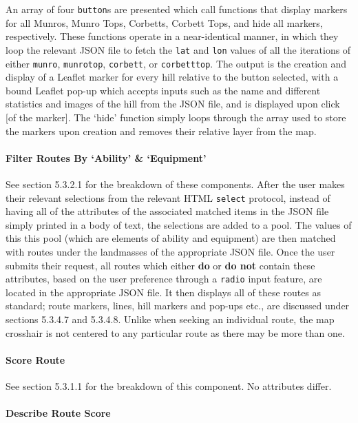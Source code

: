 \documentclass[11pt, english]{article}
\begin{document}
	An array of four \texttt{button}s are presented which call functions that display markers for all Munros, Munro Tops, Corbetts, Corbett Tops, and hide all markers, respectively. These functions operate in a near-identical manner, in which they loop the relevant JSON file to fetch the \texttt{lat} and \texttt{lon} values of all the iterations of either \texttt{munro}, \texttt{munrotop}, \texttt{corbett}, or \texttt{corbetttop}. The output is the creation and display of a Leaflet marker for every hill relative to the button selected, with a bound Leaflet pop-up which accepts inputs such as the name and different statistics and images of the hill from the JSON file, and is displayed upon click [of the marker]. The `hide' function simply loops through the array used to store the markers upon creation and removes their relative layer from the map.

			\paragraph{Filter Routes By `Ability' \& `Equipment'}

	See section 5.3.2.1 for the breakdown of these components. After the user makes their relevant selections from the relevant HTML \texttt{select} protocol, instead of having all of the attributes of the associated matched items in the JSON file simply printed in a body of text, the selections are added to a pool. The values of this this pool (which are elements of ability and equipment) are then matched with routes under the landmasses of the appropriate JSON file. Once the user submits their request, all routes which either \textbf{do} or \textbf{do not} contain these attributes, based on the user preference through a \texttt{radio} input feature, are located in the appropriate JSON file. It then displays all of these routes as standard; route markers, lines, hill markers and pop-ups etc., are discussed under sections 5.3.4.7 and 5.3.4.8. Unlike when seeking an individual route, the map crosshair is not centered to any particular route as there may be more than one.

			\paragraph{Score Route}

	See section 5.3.1.1 for the breakdown of this component. No attributes differ.

			\paragraph{Describe Route Score}
\end{document}
